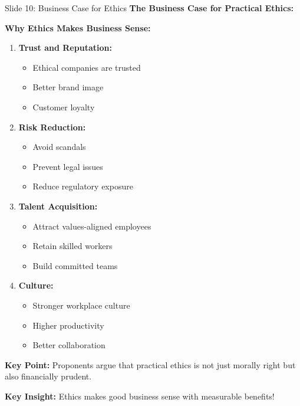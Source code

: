 \documentclass[8pt]{beamer}
\begin{document}
	\begin{frame}{Slide 10: Business Case for Ethics}
		\fontsize{6.5}{7.5}\selectfont
		\textbf{The Business Case for Practical Ethics:}
		
		\vspace{0.1cm}
		\textbf{Why Ethics Makes Business Sense:}
		\begin{enumerate}
			\item \textbf{Trust and Reputation:}
			\begin{itemize}
				\item Ethical companies are trusted
				\item Better brand image
				\item Customer loyalty
			\end{itemize}
			\item \textbf{Risk Reduction:}
			\begin{itemize}
				\item Avoid scandals
				\item Prevent legal issues
				\item Reduce regulatory exposure
			\end{itemize}
			\item \textbf{Talent Acquisition:}
			\begin{itemize}
				\item Attract values-aligned employees
				\item Retain skilled workers
				\item Build committed teams
			\end{itemize}
			\item \textbf{Culture:}
			\begin{itemize}
				\item Stronger workplace culture
				\item Higher productivity
				\item Better collaboration
			\end{itemize}
		\end{enumerate}
		
		\vspace{0.1cm}
		\textbf{Key Point:}
		Proponents argue that practical ethics is not just morally right but also financially prudent.
		
		\textcolor{myblue}{\textbf{Key Insight:}} Ethics makes \textcolor{myblue}{good business sense} with measurable benefits!
	\end{frame}
	
\end{document}
